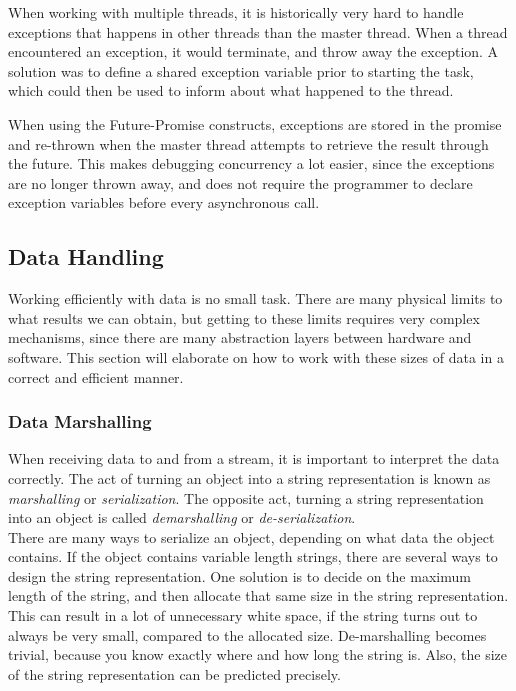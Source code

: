 \documentclass[a4paper]{article}
\begin{document}
When working with multiple threads, it is historically very hard to handle exceptions that happens in other threads than the master thread. When a thread encountered an exception, it would terminate, and throw away the exception. A solution was to define a shared exception variable prior to starting the task, which could then be used to inform about what happened to the thread. 

When using the Future-Promise constructs, exceptions are stored in the promise and re-thrown when the master thread attempts to retrieve the result through the future. This makes debugging concurrency a lot easier, since the exceptions are no longer thrown away, and does not require the programmer to declare exception variables before every asynchronous call.


\newpage
\subsection{Data Handling}
Working efficiently with data is no small task. There are many physical limits to what results we can obtain, but getting to these limits requires very complex mechanisms, since there are many abstraction layers between hardware and software. This section will elaborate on how to work with these sizes of data in a correct and efficient manner.


\subsubsection{Data Marshalling}
When receiving data to and from a stream, it is important to interpret the data correctly. The act of turning an object into a string representation is known as \textit{marshalling} or \textit{serialization}. The opposite act, turning a string representation into an object is called \textit{demarshalling} or \textit{de-serialization}.\\

There are many ways to serialize an object, depending on what data the object contains. If the object contains variable length strings, there are several ways to design the string representation. One solution is to decide on the maximum length of the string, and then allocate that same size in the string representation. This can result in a lot of unnecessary white space, if the string turns out to always be very small, compared to the allocated size. De-marshalling becomes trivial, because you know exactly where and how long the string is. Also, the size of the string representation can be predicted precisely.\\
\end{document}
